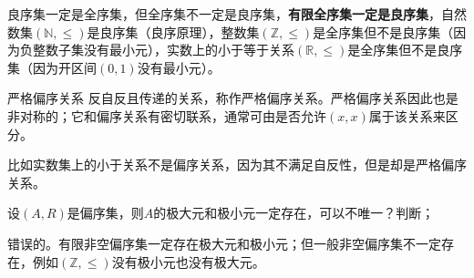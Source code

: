 良序集一定是全序集，但全序集不一定是良序集，\textbf{有限全序集一定是良序集}，自然数集$(\mathbb{N}, \leq)$是良序集（良序原理），整数集$(\mathbb{Z}, \leq)$是全序集但不是良序集（因为负整数子集没有最小元），实数上的小于等于关系$(\mathbb{R}, \leq)$是全序集但不是良序集（因为开区间$(0,1)$没有最小元）。
\begin{definition}{严格偏序关系}{}
    反自反且传递的关系，称作严格偏序关系。严格偏序关系因此也是非对称的；它和偏序关系有密切联系，通常可由是否允许$(x,x)$属于该关系来区分。
\end{definition}
比如实数集上的小于关系不是偏序关系，因为其不满足自反性，但是却是严格偏序关系。
\begin{example}{}{}
设$(A,R)$是偏序集，则$A$的极大元和极小元一定存在，可以不唯一？判断；
\end{example}
错误的。有限非空偏序集一定存在极大元和极小元；但一般非空偏序集不一定存在，例如$(\mathbb{Z},\leqslant)$没有极小元也没有极大元。
